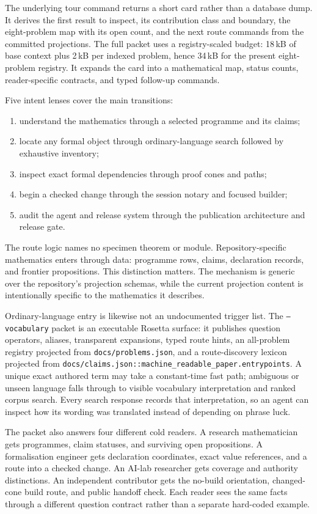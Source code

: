 \documentclass[11pt]{article}
\begin{document}
The underlying tour command returns a short card rather than a database dump. It
derives the first result to inspect, its contribution class and boundary, the
eight-problem map with its open count, and the next route commands from the committed
projections. The full packet uses a registry-scaled budget: 18\,kB of base
context plus 2\,kB per indexed problem, hence 34\,kB for the present eight-problem
registry. It expands the card into a mathematical map, status counts,
reader-specific contracts, and typed follow-up commands.

Five intent lenses cover the main transitions:
\begin{enumerate}
\item understand the mathematics through a selected programme and its claims;
\item locate any formal object through ordinary-language search followed by
      exhaustive inventory;
\item inspect exact formal dependencies through proof cones and paths;
\item begin a checked change through the session notary and focused builder;
\item audit the agent and release system through the publication architecture
      and release gate.
\end{enumerate}
The route logic names no specimen theorem or module. Repository-specific
mathematics enters through data: programme rows, claims, declaration records,
and frontier propositions. This distinction matters. The mechanism is generic
over the repository's projection schemas, while the current projection content
is intentionally specific to the mathematics it describes.

Ordinary-language entry is likewise not an undocumented trigger list. The
\texttt{--vocabulary} packet is an executable Rosetta surface: it publishes
question operators, aliases, transparent expansions, typed route hints, an
all-problem registry projected from \texttt{docs/problems.json}, and a
route-discovery lexicon projected from
\texttt{docs/claims.json::machine\_readable\_paper.entrypoints}. A unique exact
authored term may take a constant-time fast path; ambiguous or unseen language
falls through to visible vocabulary interpretation and ranked corpus search.
Every search response records that interpretation, so an agent can inspect how
its wording was translated instead of depending on phrase luck.

The packet also answers four different cold readers. A research mathematician
gets programmes, claim statuses, and surviving open propositions. A
formalisation engineer gets declaration coordinates, exact value references,
and a route into a checked change. An AI-lab researcher gets coverage and
authority distinctions. An independent contributor gets the no-build
orientation, changed-cone build route, and public handoff check. Each reader
sees the same facts through a different question contract rather than a
separate hard-coded example.
\end{document}
